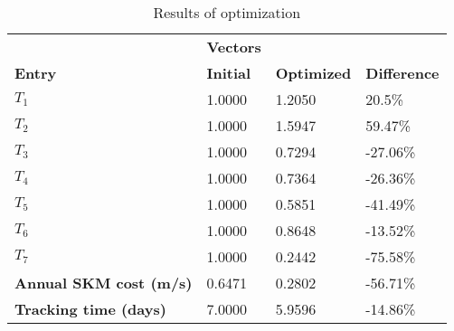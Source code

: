 \begin{table}[H]
\centering
\begin{tabular}{llll}
\textbf{}      & \cellcolor[HTML]{EFEFEF}\textbf{Vectors} & \textbf{} & \textbf{}         \\
\rowcolor[HTML]{EFEFEF} 
\textbf{Entry} & \textbf{Initial} & \textbf{Optimized} & \textbf{Difference} \\
$T_1$ & 1.0000 & 1.2050 & 20.5\% \\ 
$T_2$ & 1.0000 & 1.5947 & 59.47\% \\ 
$T_3$ & 1.0000 & 0.7294 & -27.06\% \\ 
$T_4$ & 1.0000 & 0.7364 & -26.36\% \\ 
$T_5$ & 1.0000 & 0.5851 & -41.49\% \\ 
$T_6$ & 1.0000 & 0.8648 & -13.52\% \\ 
$T_7$ & 1.0000 & 0.2442 & -75.58\% \\ 
\rowcolor[HTML]{EFEFEF} 
\textbf{Annual SKM cost (m/s)}  & 0.6471 & 0.2802 & -56.71\% \\ 
\rowcolor[HTML]{EFEFEF} 
\textbf{Tracking time (days)}  & 7.0000 & 5.9596 & -14.86\% \\ 
\end{tabular}
\caption{Results of optimization}
\label{tab:OptimizationAnalysis}
\end{table}